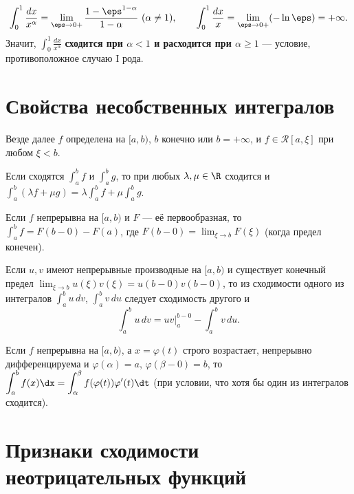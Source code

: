 \begin{example}
\[
  \int_0^{1}\frac{dx}{x^\alpha}=\lim_{\eps\to0+}\frac{1-\eps^{1-\alpha}}{1-\alpha}\ (\alpha\ne1),
  \qquad \int_0^{1}\frac{dx}{x}=\lim_{\eps\to0+}(-\ln\eps)=+\infty .
\]
Значит, $\displaystyle\int_0^{1}\frac{dx}{x^\alpha}$ \textbf{сходится при $\alpha<1$ и расходится
при $\alpha\ge1$} — условие, противоположное случаю I рода.
\end{example}

\section{Свойства несобственных интегралов}

Везде далее $f$ определена на $[a,b)$, $b$ конечно или $b=+\infty$, и $f\in\mathcal R[a,\xi]$ при
любом $\xi<b$.

\begin{property}[линейность]
Если сходятся $\int_a^b f$ и $\int_a^b g$, то при любых $\lambda,\mu\in\R$ сходится и
$\displaystyle\int_a^b(\lambda f+\mu g)=\lambda\!\int_a^b f+\mu\!\int_a^b g$.
\end{property}

\begin{property}
Если $f$ непрерывна на $[a,b)$ и $F$ — её первообразная, то
$\displaystyle\int_a^b f=F(b-0)-F(a)$, где $F(b-0)=\lim_{\xi\to b}F(\xi)$ (когда предел конечен).
\end{property}

\begin{property}
Если $u,v$ имеют непрерывные производные на $[a,b)$ и существует конечный предел
$\lim_{\xi\to b}u(\xi)v(\xi)=u(b-0)v(b-0)$, то из сходимости одного из интегралов
$\int_a^b u\,dv$, $\int_a^b v\,du$ следует сходимость другого и
\[
  \int_a^b u\,dv=uv\Big|_a^{b-0}-\int_a^b v\,du .
\]
\end{property}

\begin{property}
Если $f$ непрерывна на $[a,b)$, а $x=\varphi(t)$ строго возрастает, непрерывно дифференцируема и
$\varphi(\alpha)=a$, $\varphi(\beta-0)=b$, то
$\displaystyle\int_a^b f(x)\dx=\int_\alpha^\beta f(\varphi(t))\varphi'(t)\dt$ (при условии, что
хотя бы один из интегралов сходится).
\end{property}

\section{Признаки сходимости неотрицательных функций}

